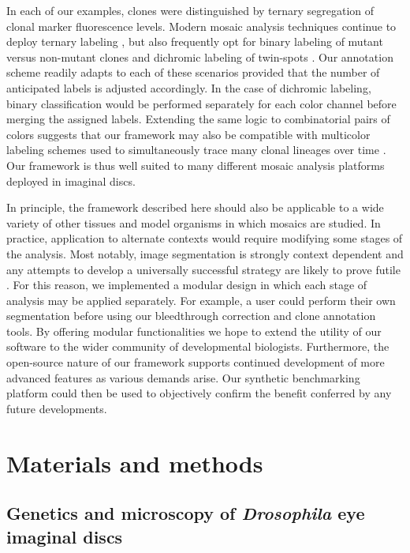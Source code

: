 \documentclass[10pt,letterpaper]{article}
\begin{document}
In each of our examples, clones were distinguished by ternary segregation of clonal marker fluorescence levels. Modern mosaic analysis techniques continue to deploy ternary labeling \cite{Gambis2011,Dourlen2013}, but also frequently opt for binary labeling of mutant versus non-mutant clones \cite{Fisher2017,Wu2007,Zhou2016} and dichromic labeling of twin-spots \cite{Heffern2009,Yu2010}. Our annotation scheme readily adapts to each of these scenarios provided that the number of anticipated labels is adjusted accordingly. In the case of dichromic labeling, binary classification would be performed separately for each color channel before merging the assigned labels. Extending the same logic to combinatorial pairs of colors suggests that our framework may also be compatible with multicolor labeling schemes used to simultaneously trace many clonal lineages over time \cite{Denes2013,Hadjieconomou2011,Hampel2011}. Our framework is thus well suited to many different mosaic analysis platforms deployed in imaginal discs.

In principle, the framework described here should also be applicable to a wide variety of other tissues \cite{Neufeld1998,Tworoger1999} and model organisms \cite{Collins2010,Munoz-Jimenez2017,Wang2007} in which mosaics are studied. In practice, application to alternate contexts would require modifying some stages of the analysis. Most notably, image segmentation is strongly context dependent and any attempts to develop a universally successful strategy are likely to prove futile \cite{Meijering2012}. For this reason, we implemented a modular design in which each stage of analysis may be applied separately. For example, a user could perform their own segmentation before using our bleedthrough correction and clone annotation tools. By offering modular functionalities we hope to extend the utility of our software to the wider community of developmental biologists. Furthermore, the open-source nature of our framework supports continued development of more advanced features as various demands arise. Our synthetic benchmarking platform could then be used to objectively confirm the benefit conferred by any future developments.


\section*{Materials and methods}

\subsection*{Genetics and microscopy of \textit{Drosophila} eye imaginal discs}
\end{document}
